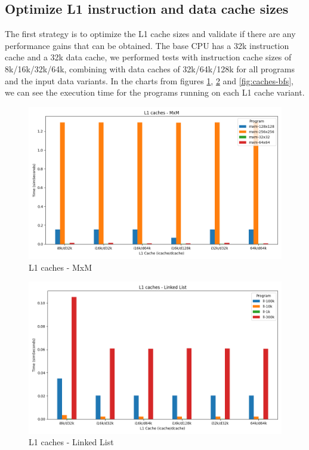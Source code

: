 \documentclass[
	article,			%
	11pt,				%
	oneside,			%
	a4paper,			%
	brazil,				%
        english,			%
	sumario=tradicional
	]{abntex2}
\begin{document}
\subsection{Optimize L1 instruction and data cache sizes}
The first strategy is to optimize the L1 cache sizes and validate if there are any performance gains that can be obtained. The base CPU has a 32k instruction cache and a 32k data cache, we performed tests with instruction cache sizes of 8k/16k/32k/64k, combining with data caches of 32k/64k/128k for all programs and the input data variants. In the charts from figures \ref{fig:caches-mxm}, \ref{fig:caches-ll} and \ref{fig:caches-bfs}, we can see the execution time for the programs running on each L1 cache variant.

\begin{figure}[H]
\caption{L1 caches - MxM}
\label{fig:caches-mxm}
\includegraphics[width=\textwidth]{images/caches-mxm.png}
\end{figure}

\begin{figure}[H]
\caption{L1 caches - Linked List}
\label{fig:caches-ll}
\includegraphics[width=\textwidth]{images/caches-ll.png}
\end{figure}
\end{document}
